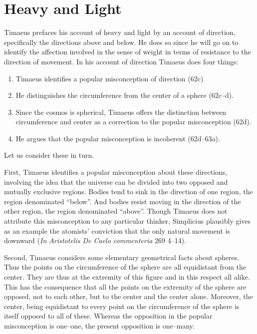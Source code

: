 
\section{Heavy and Light} %
\label{sec:heavy_and_light}

Timaeus prefaces his account of heavy and light by an account of direction, specifically the directions above and below. He does so since he will go on to identify the affection involved in the sense of weight in terms of resistance to the direction of movement. In his account of direction Timaeus does four things:
\begin{enumerate}[(1)]
	\item Timaeus identifies a popular misconception of direction (62c)
	\item He distinguishes the circumference from the center of a sphere (62c--d).
	\item Since the cosmos is spherical, Timaeus offers the distinction between circumference and center as a correction to the popular misconception (62d).
	\item He argues that the popular misconception is incoherent (62d--63a).
\end{enumerate}
Let us consider these in turn.

First, Timaeus identifies a popular misconception about these directions, involving the idea that the universe can be divided into two opposed and mutually exclusive regions. Bodies tend to sink in the direction of one region, the region denominated ``below''. And bodies resist moving in the direction of the other region, the region denominated ``above''. Though Timaeus does not attribute this misconception to any particular thinker, Simplicius plausibly gives as an example the atomists' conviction that the only natural movement is downward (\emph{In Aristotelis De Caelo commenteria} 269 4--14).

Second, Timaeus considers some elementary geometrical facts about spheres. Thus the points on the circumference of the sphere are all equidistant from the center. They are thus at the extremity of this figure and in this respect all alike. This has the consequence that all the points on the extremity of the sphere are opposed, not to each other, but to the center and the center alone. Moreover, the center, being equidistant to every point on the circumference of the sphere is itself opposed to all of these. Whereas the opposition in the popular misconception is one--one, the present opposition is one--many.

